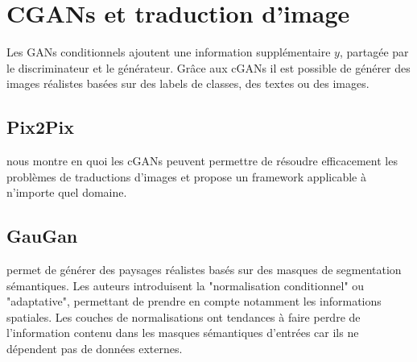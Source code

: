 \documentclass[a4paper, 12pt]{report}
\begin{document}
\section{CGANs et traduction d'image}

Les GANs conditionnels ajoutent une information supplémentaire $y$, partagée par le discriminateur et le générateur. Grâce aux cGANs il est possible de générer des images réalistes basées sur des labels de classes, des textes ou des images.

\subsection{Pix2Pix}
\cite{DBLP:journals/corr/GatysEB15a} nous montre en quoi les cGANs peuvent permettre de résoudre efficacement les problèmes de traductions d'images et propose un framework applicable à n'importe quel domaine.

\subsection{GauGan}
\cite{DBLP:journals/corr/abs-1903-07291} permet de générer des paysages réalistes basés sur des masques de segmentation sémantiques. Les auteurs introduisent la "normalisation conditionnel" ou "adaptative", permettant de prendre en compte notamment les informations spatiales.
Les couches de normalisations ont tendances à faire perdre de l'information contenu dans les masques sémantiques d'entrées car ils ne dépendent pas de données externes.
\end{document}
